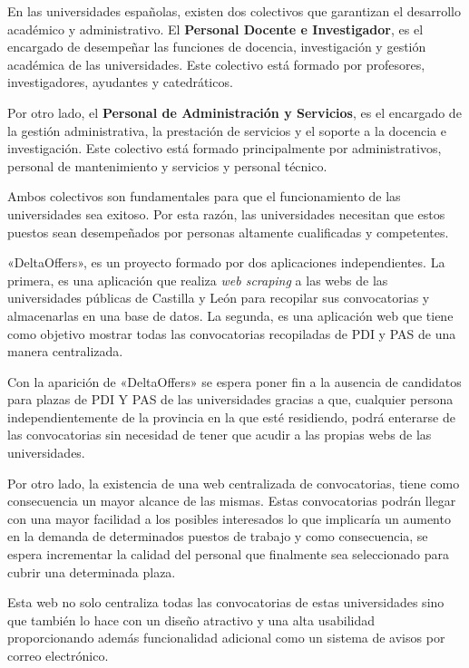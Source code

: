 
En las universidades españolas, existen dos colectivos que garantizan el desarrollo académico y administrativo. El \textbf{Personal Docente e Investigador}, es el encargado de desempeñar las funciones de docencia, investigación y gestión académica de las universidades. Este colectivo está formado por profesores, investigadores, ayudantes y catedráticos. 

Por otro lado, el \textbf{Personal de Administración y Servicios}, es el encargado de la gestión administrativa, la prestación de servicios y el soporte a la docencia e investigación. Este colectivo está formado principalmente por administrativos, personal de mantenimiento y servicios y personal técnico.

Ambos colectivos son fundamentales para que el funcionamiento de las universidades sea exitoso. Por esta razón, las universidades necesitan que estos puestos sean desempeñados por personas altamente cualificadas y competentes.

«DeltaOffers», es un proyecto formado por dos aplicaciones independientes. La primera, es una aplicación que realiza \textit{web scraping} a las webs de las universidades públicas de Castilla y León para recopilar sus convocatorias y almacenarlas en una base de datos. La segunda, es una aplicación web que tiene como objetivo mostrar todas las convocatorias recopiladas de PDI y PAS de una manera centralizada.

Con la aparición de «DeltaOffers» se espera poner fin a la ausencia de candidatos para plazas de PDI Y PAS de las universidades gracias a que, cualquier persona independientemente de la provincia en la que esté residiendo, podrá enterarse de las convocatorias sin necesidad de tener que acudir a las propias webs de las universidades.

Por otro lado, la existencia de una web centralizada de convocatorias, tiene como consecuencia un mayor alcance de las mismas. Estas convocatorias podrán llegar con una mayor facilidad a los posibles interesados lo que  implicaría un aumento en la demanda de determinados puestos de trabajo y como consecuencia, se espera incrementar la calidad del personal que finalmente sea seleccionado para cubrir una determinada plaza.

Esta web no solo centraliza todas las convocatorias de estas universidades sino que también lo hace con un diseño atractivo y una alta usabilidad proporcionando además funcionalidad adicional como un sistema de avisos por correo electrónico.

